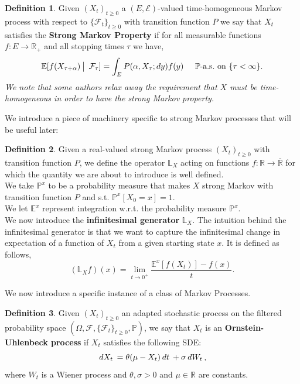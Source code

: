 \documentclass[12pt]{article}
\newcommand{\cF}{\mathcal{F}}
\newcommand{\E}{\mathbb{E}}
\newcommand{\R}{\mathbb{R}}
\newcommand{\bL}{\mathbb{L}}
\newcommand{\Prb}{\mathbb{P}}
\newcommand{\quantifyspace}{\hspace{2px} \big | \hspace{5px}}
\newcommand{\oR}{\overline{\R}}
\newcommand{\df}[1]{\hspace{2 px} d #1 \hspace{2 px}}
\newcommand{\cFPS}{(\Omega, \cF, \{ \cF_t\}_{t \geq 0}, \Prb)}
\newcommand{\cFi}{\{\cF_t\}_{t \geq 0}}
\newcommand{\spc}{\hspace{7 px}}
\newcommand{\als}{\text{a.s.}}
\theoremstyle{definition}
\newtheorem{defn}{Definition}
\begin{document}
\begin{defn}
    Given $(X_t)_{t \geq 0}$ a $(E, \mathcal{E})$-valued time-homogeneous Markov process with respect to $\cFi$ with transition function $P$
    we say that $X_t$ satisfies the \textbf{Strong Markov Property} if for all measurable functions $f: E \to \R_+$ and all stopping times $\tau$ we have,
    \[
        \E[f(X_{\tau+\alpha}) \quantifyspace \cF_\tau] = \int_E P(\alpha, X_\tau; dy) f(y) \spc \spc \Prb\text{-}\als \text{ on } \{\tau < \infty\}.
    \]
    \small{ \spc \textit{We note that some authors relax away the requirement that $X$ must be time-homogeneous in order to have the strong Markov property.}}
\end{defn}

We introduce a piece of machinery specific to strong Markov processes that will be useful later:
\begin{defn}
    Given a real-valued strong Markov process $(X_t)_{t \geq 0}$ with transition function $P$, we define the operator $\bL_X$ acting on functions $f: \R \to \oR$ for which the quantity we are about to introduce is well defined. \\
    We take $\Prb^x$ to be a probability measure that makes $X$ strong Markov with transition function $P$ and s.t. $\Prb^x[X_0 = x] = 1$. \\
    We let $\E^x$ represent integration w.r.t. the probability measure $\Prb^x$. \\
    We now introduce the \textbf{infinitesimal generator} $\bL_X$.
    The intuition behind the infinitesimal generator is that we want to capture the infinitesimal change in expectation of a function of $X_t$ from a given starting state $x$. It is defined as follows,
    \[
        (\bL_X f)(x) = \lim_{t \to 0^+}\frac{\E^x[f(X_t)] - f(x)}{t}.
    \]
\end{defn}


We now introduce a specific instance of a class of Markov Processes.
\begin{defn}
    Given $(X_t)_{t \geq 0}$ an adapted stochastic process on the filtered probability space $\cFPS$,
    we say that $X_t$ is an \textbf{Ornstein-Uhlenbeck process} if $X_t$ satisfies the following SDE:
    \[
        \df{X_t} = \theta (\mu - X_t) \df{t} + \sigma \df{W_t},
    \]
    where $W_t$ is a Wiener process and $\theta, \sigma > 0$ and $\mu \in \R$ are constants. \\
\end{defn}
\end{document}
